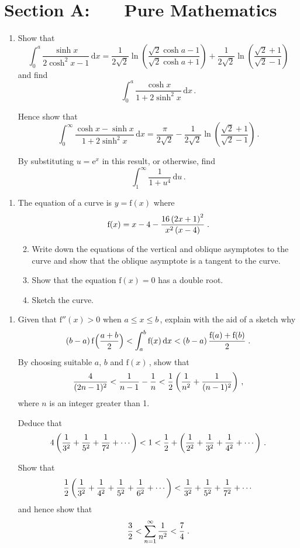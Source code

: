 \documentclass[a4, 11pt]{report}
\newlength{\qspace}
\newcounter{qnumber}
\newenvironment{question}%
 {\vspace{\qspace}
  \begin{enumerate}[\bfseries 1\quad][10]%
    \setcounter{enumi}{\value{qnumber}}%
    \item%
 }
{
  \end{enumerate}
  \filbreak
  \stepcounter{qnumber}
 }
\newenvironment{questionparts}[1][1]%
 {
  \begin{enumerate}[\bfseries (i)]%
    \setcounter{enumii}{#1}
    \addtocounter{enumii}{-1}
    \setlength{\itemsep}{5mm}
    \setlength{\parskip}{8pt}
 }
 {
  \end{enumerate}
 }
\def\e{{\mathrm e}}
\def\f{{\mathrm f}}
\def\le{\leqslant}
\def\l{\left(}
\def\r{\right)}
\begin{document}
\setcounter{page}{2}

 
\section*{Section A: \ \ \ Pure Mathematics}

\begin{question}
Show that
\[
\int_0^a \frac{\sinh x}{2\cosh^2 x -1} \, \mathrm{d} x = \frac{1}{2 \sqrt{2}} \ln \l \frac{\sqrt{2}\cosh a -1}{\sqrt{2}\cosh a +1}\r + \frac{1}{2 \sqrt{2}} \ln \l \frac{\sqrt{2}+1}{\sqrt{2}-1}\r
\]
and find
\[
\int_0^a \frac{\cosh x}{1+2\sinh^2 x} \, \mathrm{d} x \, .
\]

Hence show that 
\[
\int_0^\infty \frac{\cosh x - \sinh x}{1+2\sinh^2 x} \, \mathrm{d} x = \frac{\pi}{2\sqrt{2}} - \frac{1}{2 \sqrt{2}} \ln \l \frac{\sqrt{2}+1}{\sqrt{2}-1}\r \, .
\]

By substituting $u = \e^x$ in this result, or otherwise, find
\[
\int_1^\infty \frac{1}{1+u^4} \, \mathrm{d} u \, .
\]
\end{question}

\begin{question}
The equation of a curve is $y=\f ( x )$ where
\[
\f ( x ) = x-4-{16 \l 2x+1 \r^2 \over x^2 \l x - 4 \r} \;.
\]

\begin{questionparts}
\item
Write down the equations of the vertical and oblique asymptotes to the curve and 
show that the oblique asymptote is a tangent to the curve. 
\item
Show that the equation $\f ( x ) =0$ has a double root.
\item
Sketch the curve.
\end{questionparts}
\end{question}

\begin{question}
Given that $\f''(x) > 0$ when $a \le x \le b\,$, 
explain with the aid of a sketch why
\[
(b-a) \, \f  \Big( {a+b \over 2} \Big)  
< \int^b_a \f(x) \, \mathrm{d}x 
< (b-a) \, \displaystyle \frac{\f(a) + \f(b)}{2} \;.
\]
By choosing suitable $a$, $b$ and $\f(x)\,$, show that
\[
{4 \over (2n-1)^2} < {1 \over n-1} - {1 \over n} 
< {1 \over 2} \l {1 \over n^2} + {1 \over (n-1)^2}\r \,,
\]
where $n$ is an integer greater than 1.

Deduce that
\[
4 \l {1 \over 3^2} +{1 \over 5^2} + {1 \over 7^2} + \cdots \r 
< 1 
< {1 \over 2} + 
\left( {1 \over 2^2} +{1 \over 3^2} + {1 \over 4^2} + \cdots \right)\,.
\]

Show that  
\[
{1 \over 2} \l {1 \over 3^2} 
+ {1 \over 4^2} + {1 \over 5^2} + \frac 1 {6^2} + \cdots \right)
<
{1 \over 3^2} +{1 \over 5^2} + {1 \over 7^2} 
+  \cdots
\]
 and hence show that
\[
 {3 \over 2} \displaystyle 
< \sum_{n=1}^\infty {1 \over n^2} <{7 \over 4}\;.
\]
\end{question}
\end{document}
